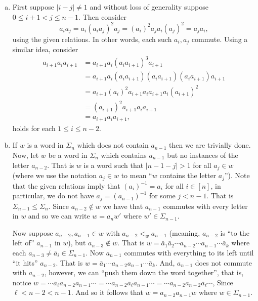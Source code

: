 \documentclass[12pt,letterpaper,boxed]{hmcpset}
\newcommand{\abs}[1]{\left|#1\right|}
\newcommand{\inv}{^{-1}}
\begin{document}
\begin{solution}
\begin{enumerate}[(a)]
\item 
First suppose $\abs{i -j} \neq 1$ and without loss of generality
suppose $0 \leq i+1 < j \leq n-1$. Then consider 
\[
	a_i a_j = a_i (a_ia_j)^2 a_j = (a_i)^2 a_j a_i (a_j)^2 = a_j a_i,
\]
using the given relations. In other words, each such $a_i, a_j$
commute. Using a similar idea, consider 
\begin{align*}
	a_{i+1}a_i a_{i+1} 
		&= a_{i+1} a_i (a_ia_{i+1})^3 a_{i+1} \\
		&= a_{i+1} a_i (a_ia_{i+1}) (a_ia_{i+1})(a_ia_{i+1}) a_{i+1} \\
		&= a_{i+1} (a_i)^2 a_{i+1} a_i a_{i+1} a_i (a_{i+1})^2  \\
	 	&= (a_{i+1})^2 a_{i+1}a_i a_{i+1} \\
	 	&= a_{i+1}a_i a_{i+1}, 
\end{align*}
holds for each $1 \leq i \leq n-2$. 

\item
If $w$ is a word in $\Sigma_n$ which does not contain $a_{n-1}$ then we are
trivially done. 
Now, let $w$ be a word in $\Sigma_n$ which contains $a_{n-1}$ but no
instances of the letter $a_{n-2}$. That is $w$ is a word such that
$\abs{n-1 - j} > 1$ for all $a_j \in w$ (where we use the notation
$a_j \in w$ to mean ``$w$ contains the letter $a_j$''). Note that the
given relations imply that $(a_i)\inv = a_i$ for all $i \in [n]$, in
particular, we do not have $a_j = (a_{n-1})\inv$ for some $j < n-1$.
That is $\Sigma_{n-1} \leq \Sigma_n$.
Since $a_{n-2} \not\in w$ we have that $a_{n-1}$ commutes with every
letter in $w$ and so we can write $w = a_n w'$ where $w' \in
\Sigma_{n-1}$.

Now suppose $a_{n-2}, a_{n-1} \in w$ with $a_{n-2} <_w a_{n-1}$
(meaning, $a_{n-2}$ is ``to the left of'' $a_{n-1}$ in $w$), but
$a_{n-3} \not\in w$. That is $w = \bar a_1 \bar a_2 \cdots a_{n-2}
\cdots a_{n-1} \cdots \bar a_k$ where each $a_{n-3} \neq \bar a_i \in
\Sigma_{n-1}$. Now $a_{n-1}$ commutes with everything to its left
until ``it hits'' $a_{n-2}$. That is $w = \bar a_1 \cdots a_{n-2}
a_{n-1} \cdots \bar a_k$. And, $a_{n-1}$ does not commute with
$a_{n-2}$, however, we can ``push them down the word together'', that
is, notice $w = \cdots \bar a_\ell a_{n-2}a_{n-1} \cdots = \cdots a_{n-2}
\bar a_\ell a_{n-1} \cdots = \cdots a_{n-2}a_{n-2} \bar a_\ell
\cdots$, Since $\ell < n-2 < n-1$. And so it follows that $w =
a_{n-2}a_{n-1} w$ where $w \in \Sigma_{n-1}$.


\end{enumerate}
\end{solution}
\end{document}
